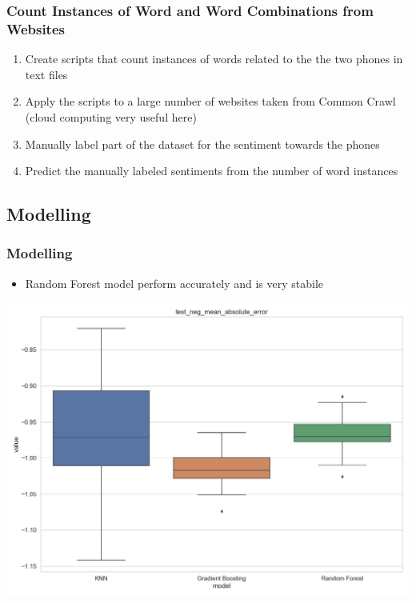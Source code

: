 \documentclass[10pt]{beamer}
\begin{document}
\begin{frame}
\frametitle{Count Instances of Word and Word Combinations from Websites}

\begin{enumerate}
    \item Create scripts that count instances of words related to the the two phones in text files
    \pause
    \item Apply the scripts to a large number of websites taken from Common Crawl (cloud computing very useful here)
    \pause
    \item Manually label part of the dataset for the sentiment towards the phones
    \pause
    \item Predict the manually labeled sentiments from the number of word instances
\end{enumerate}


\end{frame}

\subsection{Modelling}

\begin{frame}
\frametitle{Modelling}

\begin{itemize}
    \item Random Forest model perform accurately and is very stabile
\end{itemize}

{
    \centering
    \includegraphics[width=\textwidth,height=0.8\textheight,keepaspectratio]{model_comparison_iphone_test_neg_mean_absolute_error.png}
    \par
}

\end{frame}
\end{document}
